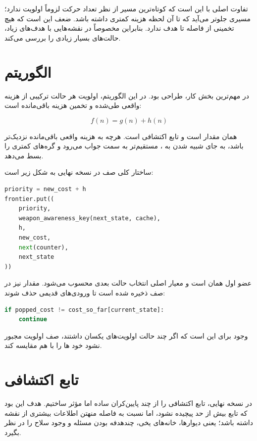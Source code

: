 \documentclass[10.5pt]{exam}
\begin{document}
تفاوت اصلی
با
این است که کوتاه‌ترین مسیر از نظر تعداد حرکت لزوماً اولویت ندارد؛ مسیری جلوتر می‌آید که تا آن لحظه هزینه کمتری داشته باشد. ضعف
این است که هیچ تخمینی از فاصله تا هدف ندارد. بنابراین مخصوصاً در نقشه‌هایی با هدف‌های زیاد، حالت‌های بسیار زیادی را بررسی می‌کند.

\section{الگوریتم }
در
مهم‌ترین بخش کار، طراحی
بود. در این الگوریتم، اولویت هر حالت ترکیبی از هزینه واقعی طی‌شده و تخمین هزینه باقی‌مانده است:

\[
    f(n) = g(n) + h(n)
\]

همان مقدار
است و
تابع اکتشافی است. هرچه
به هزینه واقعی باقی‌مانده نزدیک‌تر باشد،
به جای شبیه شدن به
، مستقیم‌تر به سمت جواب می‌رود و گره‌های کمتری را بسط می‌دهد.

ساختار کلی صف در نسخه نهایی به شکل زیر است:

\begin{latin}
\begin{lstlisting}[language=Python]
priority = new_cost + h
frontier.put((
    priority,
    weapon_awareness_key(next_state, cache),
    h,
    new_cost,
    next(counter),
    next_state
))
\end{lstlisting}
\end{latin}

عضو اول همان
است و معیار اصلی انتخاب حالت بعدی محسوب می‌شود. مقدار
نیز در صف ذخیره شده است تا ورودی‌های قدیمی حذف شوند:

\begin{latin}
\begin{lstlisting}[language=Python]
if popped_cost != cost_so_far[current_state]:
    continue
\end{lstlisting}
\end{latin}

وجود
برای این است که اگر چند حالت اولویت‌های یکسان داشتند، صف اولویت مجبور نشود خود
ها را با هم مقایسه کند.

\section{تابع اکتشافی }
در نسخه نهایی، تابع اکتشافی را از چند پایین‌کران ساده اما مؤثر ساختیم. هدف این بود که تابع بیش از حد پیچیده نشود، اما نسبت به فاصله منهتن اطلاعات بیشتری از نقشه داشته باشد؛ یعنی دیوارها، خانه‌های یخی، چندهدفه بودن مسئله و وجود سلاح را در نظر بگیرد.
\end{document}
